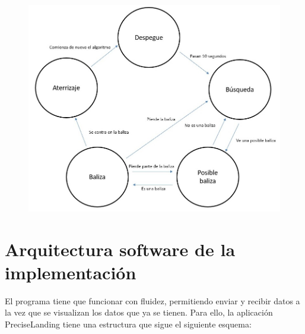 \begin{figure}[H]
	\centering
		\includegraphics[width=1\textwidth]{imgs/EsquemaAlgoritmo.jpg}
	\label{fig:Esquema_control}
\end{figure}





\section{Arquitectura software de la implementaci\'on}

\hspace{1 cm} El programa tiene que funcionar con fluidez, permitiendo enviar y recibir datos a la vez que se visualizan los datos que ya se tienen. Para ello, la aplicaci\'on PreciseLanding tiene una estructura que sigue el siguiente esquema:

